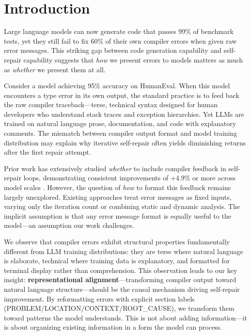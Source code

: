 \section{Introduction}

Large language models can now generate code that passes 99\% of benchmark tests, yet they still fail to fix 60\% of their own compiler errors when given raw error messages. This striking gap between code generation capability and self-repair capability suggests that \emph{how} we present errors to models matters as much as \emph{whether} we present them at all.

Consider a model achieving 95\% accuracy on HumanEval. When this model encounters a type error in its own output, the standard practice is to feed back the raw compiler traceback---terse, technical syntax designed for human developers who understand stack traces and exception hierarchies. Yet LLMs are trained on natural language prose, documentation, and code with explanatory comments. The mismatch between compiler output format and model training distribution may explain why iterative self-repair often yields diminishing returns after the first repair attempt.

Prior work has extensively studied \emph{whether} to include compiler feedback in self-repair loops, demonstrating consistent improvements of +4.9\% or more across model scales \citep{chen2024selfrepair}. However, the question of \emph{how} to format this feedback remains largely unexplored. Existing approaches treat error messages as fixed inputs, varying only the iteration count or combining static and dynamic analysis. The implicit assumption is that any error message format is equally useful to the model---an assumption our work challenges.

We observe that compiler errors exhibit structural properties fundamentally different from LLM training distributions: they are terse where natural language is elaborate, technical where training data is explanatory, and formatted for terminal display rather than comprehension. This observation leads to our key insight: \textbf{representational alignment}---transforming compiler output toward natural language structure---should be the causal mechanism driving self-repair improvement. By reformatting errors with explicit section labels (PROBLEM/LOCATION/CONTEXT/ROOT\_CAUSE), we transform them toward patterns the model understands. This is not about adding information---it is about organizing existing information in a form the model can process.

